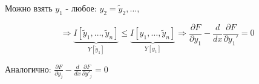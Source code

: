 \documentclass[12pt, a4paper]{report}
\begin{document}
Можно взять \( y_1   \) - любое: \( y_2=\tilde{y}_2, \ldots ,   \) 

\[\Rightarrow \underbrace{ I[\tilde{y}_1, \ldots, \tilde{y   }_n ]}_{Y[\tilde{y } _1] } \le \underbrace{I[y_1, \ldots, \tilde{y  }_n ]}_{Y[y_1 ]} \Rightarrow \frac{\partial F }{\partial  y_1} - \frac{d}{dx }  \frac{\partial  F }{\partial  y_1 '}= 0     \]  

Аналогично: \( \frac{\partial F }{\partial  y_j }- \frac{d}{dx }  \frac{\partial F }{\partial  y ' _j} = 0   \) 



\ifdefined\mainfile
\else
    
\end{document}
